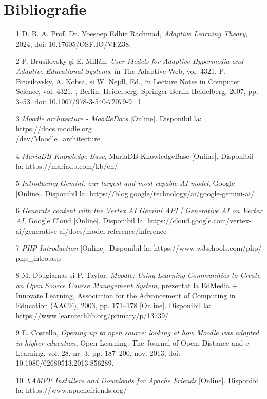 \chapter*{Bibliografie} 

\begin{itemize}
    \item [1] D. B. A. Prof. Dr. Yoesoep Edhie Rachmad, \textit{Adaptive Learning Theory}, 2024, doi: 10.17605/OSF.IO/VFZ38.
    \item [2] P. Brusilovsky și E. Millán, \textit{User Models for Adaptive Hypermedia and Adaptive Educational Systems}, în The Adaptive Web, vol. 4321, P. Brusilovsky, A. Kobsa, și W. Nejdl, Ed., în Lecture Notes in Computer Science, vol. 4321. , Berlin, Heidelberg: Springer Berlin Heidelberg, 2007, pp. 3–53. doi: 10.1007/978-3-540-72079-9\_1.
    \item [3] \textit{Moodle architecture - MoodleDocs} [Online]. Disponibil la: https://docs.moodle.org\\/dev/Moodle\_architecture
    \item [4] \textit{MariaDB Knowledge Base}, MariaDB KnowledgeBase [Online]. Disponibil la: https://mariadb.com/kb/en/
    \item [5] \textit{Introducing Gemini: our largest and most capable AI model}, Google [Online]. Disponibil la: https://blog.google/technology/ai/google-gemini-ai/
    \item [6] \textit{Generate content with the Vertex AI Gemini API | Generative AI on Vertex AI}, Google Cloud [Online]. Disponibil la: https://cloud.google.com/vertex-ai/generative-ai/docs/model-reference/inference
    \item [7] \textit{PHP Introduction} [Online]. Disponibil la: https://www.w3schools.com/php/\\php\_intro.asp
    \item [8] M. Dougiamas și P. Taylor, \textit{Moodle: Using Learning Communities to Create an Open Source Course Management System}, prezentat la EdMedia + Innovate Learning, Association for the Advancement of Computing in Education (AACE), 2003, pp. 171–178 [Online]. Disponibil la: https://www.learntechlib.org/primary/p/13739/
    \item [9] E. Costello, \textit{Opening up to open source: looking at how Moodle was adopted in higher education}, Open Learning: The Journal of Open, Distance and e-Learning, vol. 28, nr. 3, pp. 187–200, nov. 2013, doi: 10.1080/02680513.2013.856289.
    \item [10] \textit{XAMPP Installers and Downloads for Apache Friends} [Online]. Disponibil la: https://www.apachefriends.org/
\end{itemize}